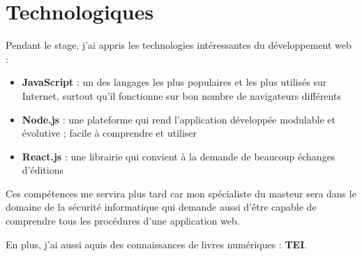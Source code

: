 \section{Technologiques}

Pendant le stage, j'ai appris les technologies intéressantes du développement web :

\begin{itemize}
    \item \textbf{JavaScript} : un des langages les plus populaires et les plus utilisés sur Internet, surtout qu'il fonctionne sur bon nombre de navigateurs différents
    \item \textbf{Node.js} : une plateforme qui rend l'application développée modulable et évolutive ; facile à comprendre et utiliser
    \item \textbf{React.js} : une librairie qui convient à la demande de beaucoup échanges d'éditions
\end{itemize}

Ces compétences me servira plus tard car mon spécialiste du masteur sera dans le domaine de la sécurité informatique qui demande aussi d'être capable de comprendre tous les procédures d'une application web.

En plus, j'ai aussi aquis des connaissances de livres numériques : \textbf{TEI}.